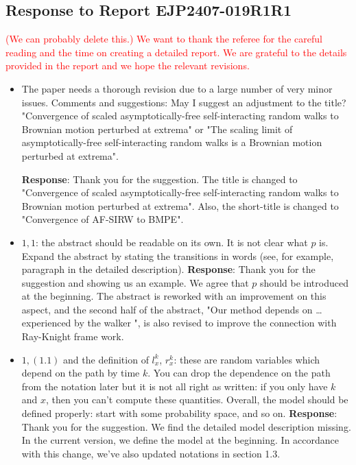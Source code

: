 \documentclass[11pt,a4paper]{article}
\numberwithin{equation}{section}
\def\TBF#1{\textcolor{red}{#1}} %
\begin{document}
	\subsection*{Response to Report EJP2407-019R1R1}
	\TBF{(We can probably delete this.) We want to thank the referee for the careful reading and the time on creating a detailed report. We are grateful to the details provided in the report and we hope the relevant revisions.   }
	\begin{itemize}
		\item The paper needs a thorough revision due to a large number of very minor issues.
		Comments and suggestions: May I suggest an adjustment to the title? "Convergence of scaled
		asymptotically-free self-interacting random walks to Brownian motion perturbed at extrema" or "The scaling limit of asymptotically-free self-interacting random walks is a Brownian motion perturbed at
		extrema".
		
		\subitem \textbf{Response}:  Thank you for the suggestion. The title is changed to "Convergence of scaled asymptotically-free
		self-interacting random walks to Brownian motion
		perturbed at extrema". Also, the short-title is changed to "Convergence of AF-SIRW to BMPE". 
		
		\item 
		$1,1$: the abstract should be readable on its own. It is not clear what $p$ is. Expand the abstract by stating the transitions in words (see, for example, paragraph in the detailed description).
		\subitem \textbf{Response}: Thank you for the suggestion and showing us an example. We agree that $p$ should be introduced at the beginning. The abstract is reworked with an improvement on this aspect, and the second half of the abstract, "Our method depends on \dots experienced by the walker ", is also revised to improve the connection with Ray-Knight frame work. 
		
		\item 
		$1,(1.1)$ and the definition of $l_x^k$, $r_x^k$: these are random variables which depend on the path by time $k$. You can drop the dependence on the path from the notation later but it is not all right as written:	if you only have $k$ and $x$, then you can't compute these quantities. Overall, the model should be defined properly: start with some probability space, and so on.
		\subitem \textbf{Response}: Thank you for the suggestion. We find the detailed model description missing. In the current version, we define the model at the beginning. In accordance with this change, we've also updated notations in section 1.3.
		

\end{itemize}
\end{document}
